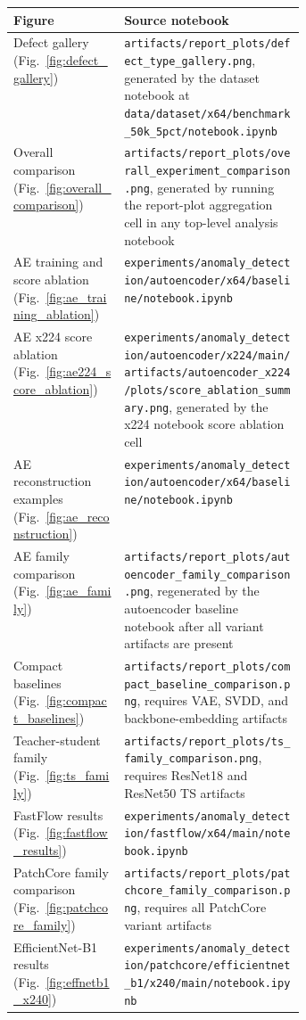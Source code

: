 \documentclass[11pt]{article}
\begin{document}
\begin{tabularx}{\linewidth}{>{\raggedright\arraybackslash}p{0.38\linewidth}>{\raggedright\arraybackslash}X}
\toprule
Figure & Source notebook \\
\midrule
Defect gallery (Fig.~\ref{fig:defect_gallery})
  & \texttt{artifacts/report\_plots/defect\_type\_gallery.png}, generated by the dataset notebook at \texttt{data/dataset/x64/benchmark\_50k\_5pct/notebook.ipynb} \\
Overall comparison (Fig.~\ref{fig:overall_comparison})
  & \texttt{artifacts/report\_plots/overall\_experiment\_comparison.png}, generated by running the report-plot aggregation cell in any top-level analysis notebook \\
AE training and score ablation (Fig.~\ref{fig:ae_training_ablation})
  & \texttt{experiments/anomaly\_detection/autoencoder/x64/baseline/notebook.ipynb} \\
AE x224 score ablation (Fig.~\ref{fig:ae224_score_ablation})
  & \texttt{experiments/anomaly\_detection/autoencoder/x224/main/artifacts/autoencoder\_x224/plots/score\_ablation\_summary.png}, generated by the x224 notebook score ablation cell \\
AE reconstruction examples (Fig.~\ref{fig:ae_reconstruction})
  & \texttt{experiments/anomaly\_detection/autoencoder/x64/baseline/notebook.ipynb} \\
AE family comparison (Fig.~\ref{fig:ae_family})
  & \texttt{artifacts/report\_plots/autoencoder\_family\_comparison.png}, regenerated by the autoencoder baseline notebook after all variant artifacts are present \\
Compact baselines (Fig.~\ref{fig:compact_baselines})
  & \texttt{artifacts/report\_plots/compact\_baseline\_comparison.png}, requires VAE, SVDD, and backbone-embedding artifacts \\
Teacher-student family (Fig.~\ref{fig:ts_family})
  & \texttt{artifacts/report\_plots/ts\_family\_comparison.png}, requires ResNet18 and ResNet50 TS artifacts \\
FastFlow results (Fig.~\ref{fig:fastflow_results})
  & \texttt{experiments/anomaly\_detection/fastflow/x64/main/notebook.ipynb} \\
PatchCore family comparison (Fig.~\ref{fig:patchcore_family})
  & \texttt{artifacts/report\_plots/patchcore\_family\_comparison.png}, requires all PatchCore variant artifacts \\
EfficientNet-B1 results (Fig.~\ref{fig:effnetb1_x240})
  & \texttt{experiments/anomaly\_detection/patchcore/efficientnet\_b1/x240/main/notebook.ipynb} \\

\end{tabularx}
\end{document}
